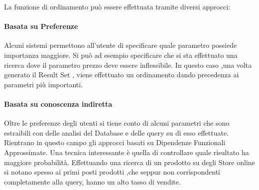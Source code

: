 La funzione di ordinamento può essere effettuata tramite diversi approcci:
\paragraph{Basata su Preferenze}
Alcuni sistemi permettono all'utente di specificare quale parametro possiede importanza maggiore. Si può ad esempio specificare che si sta effettuato una ricerca dove il parametro prezzo deve essere inflessibile. In questo caso ,una volta generato il Result Set , viene effettuato un ordinamento dando precedenza ai parametri più importanti.\cite{query_answering}
\paragraph{Basata su conoscenza indiretta}
Oltre le preferenze degli utenti si tiene conto di alcuni parametri che sono estraibili con delle analisi del Database e delle query su di esso effettuate.
Rientrano in questo campo gli approcci basati su Dipendenze Funzionali Approssimate.
Una tecnica interessante è quella di controllare quale risultato ha maggiore probabilità. Effettuando una ricerca di un prodotto su degli Store online si notano spesso ai primi posti prodotti ,che seppur non corrispondenti completamente alla query, hanno un alto tasso di vendite. 


